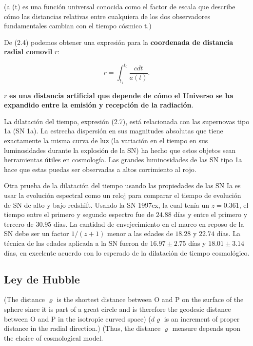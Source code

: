 \documentclass[11pt]{article}
\begin{document}
(a (t) es una función universal conocida como el factor de escala que describe cómo las distancias relativas entre cualquiera de los dos observadores fundamentales cambian con el tiempo cósmico t.)

De (2.4) podemos obtener una expresión para la {\bf{coordenada de distancia radial comovil}} $r$:

    \begin{equation}
        r = \int_{t_1}^{t_0}{\frac{c dt }{a (t)}}.
    \end{equation} 

    $r$ {\bf{es una distancia artificial que depende de cómo el Universo se ha expandido entre la emisión y recepción de la radiación}}.

La dilatación del tiempo, expresión (2.7), está relacionada con las supernovas tipo 1a (SN 1a). La estrecha dispersión en sus magnitudes absolutas que tiene exactamente la misma curva de luz  (la variación en el tiempo en sus luminosidades durante la explosión de la SN) ha hecho que estos objetos sean herramientas útiles en cosmología. Las grandes luminosidades de las SN tipo 1a hace que estas puedas ser observadas a altos corrimiento al rojo. 


Otra prueba de la dilatación del tiempo usando las propiedades de las SN Ia es usar la evolución espectral como un reloj para comparar el tiempo de evolución de SN de alto y bajo redshift. Usando la SN 1997ex, la cual tenía un $z= 0.361$, el tiempo entre el primero y segundo espectro fue de $24.88$ días y entre el primero y tercero de $30.95$ días. La cantidad de envejecimiento en el marco en reposo de la SN debe ser un factor $1/(z+1)$ menor a las edades de $18.28$ y $22.74$ días. La técnica de las edades aplicada a la SN fueron de $16.97 \pm 2.75$ días y $18.01 \pm 3.14$ días, en excelente acuerdo con lo esperado de la dilatación de tiempo cosmológico. 


\subsection{Ley de Hubble} 

(The distance $\varrho$ is the shortest distance between O and P on the surface of the sphere
since it is part of a great circle and is therefore the geodesic distance between O and
P in the isotropic curved space)
($d \varrho$ is an increment of proper distance in the radial direction.)
(Thus, the distance $\varrho$ measure depends upon the choice of cosmological model.
\end{document}
